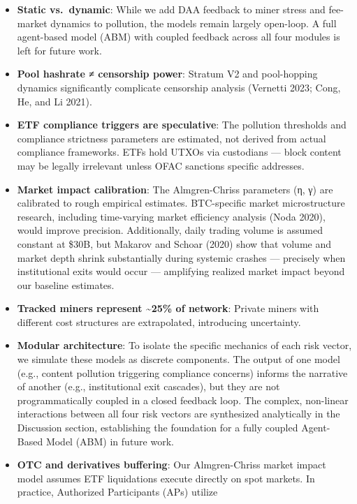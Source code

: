 \documentclass[
  11pt,
]{article}
\providecommand{\tightlist}{%
  \setlength{\itemsep}{0pt}\setlength{\parskip}{0pt}}\usepackage{longtable,booktabs,array}
\begin{document}
\begin{itemize}
\tightlist
\item
  \textbf{Static vs.~dynamic}: While we add DAA feedback to miner stress
  and fee-market dynamics to pollution, the models remain largely
  open-loop. A full agent-based model (ABM) with coupled feedback across
  all four modules is left for future work.
\item
  \textbf{Pool hashrate ≠ censorship power}: Stratum V2 and pool-hopping
  dynamics significantly complicate censorship analysis (Vernetti 2023;
  Cong, He, and Li 2021).
\item
  \textbf{ETF compliance triggers are speculative}: The pollution
  thresholds and compliance strictness parameters are estimated, not
  derived from actual compliance frameworks. ETFs hold UTXOs via
  custodians --- block content may be legally irrelevant unless OFAC
  sanctions specific addresses.
\item
  \textbf{Market impact calibration}: The Almgren-Chriss parameters (η,
  γ) are calibrated to rough empirical estimates. BTC-specific market
  microstructure research, including time-varying market efficiency
  analysis (Noda 2020), would improve precision. Additionally, daily
  trading volume is assumed constant at \$30B, but Makarov and Schoar
  (2020) show that volume and market depth shrink substantially during
  systemic crashes --- precisely when institutional exits would occur
  --- amplifying realized market impact beyond our baseline estimates.
\item
  \textbf{Tracked miners represent \textasciitilde25\% of network}:
  Private miners with different cost structures are extrapolated,
  introducing uncertainty.
\item
  \textbf{Modular architecture}: To isolate the specific mechanics of
  each risk vector, we simulate these models as discrete components. The
  output of one model (e.g., content pollution triggering compliance
  concerns) informs the narrative of another (e.g., institutional exit
  cascades), but they are not programmatically coupled in a closed
  feedback loop. The complex, non-linear interactions between all four
  risk vectors are synthesized analytically in the Discussion section,
  establishing the foundation for a fully coupled Agent-Based Model
  (ABM) in future work.
\item
  \textbf{OTC and derivatives buffering}: Our Almgren-Chriss market
  impact model assumes ETF liquidations execute directly on spot
  markets. In practice, Authorized Participants (APs) utilize

\end{itemize}
\end{document}
